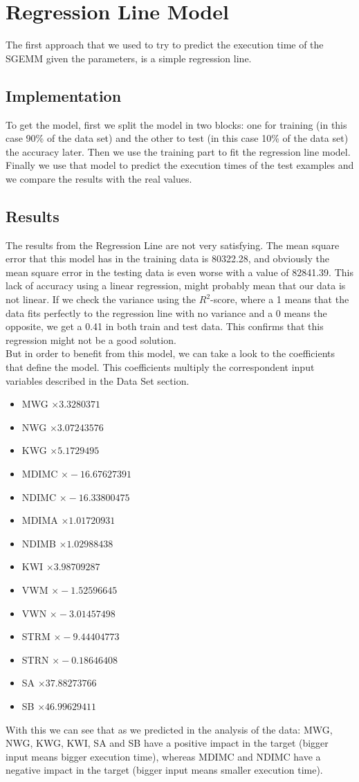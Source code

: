 \documentclass[sigconf,authorversion]{acmart}
\begin{document}
\section{Regression Line Model}
The first approach that we used to try to predict the execution time of the SGEMM given the parameters, is a simple regression line.
\subsection{Implementation}
To get the model, first we split the model in two blocks: one for training (in this case 90\% of the data set) and the other to test (in this case 10\% of the data set) the accuracy later. Then we use the training part to fit the regression line model. Finally we use that model to predict the execution times of the test examples and we compare the results with the real values.
\subsection{Results}
The results from the Regression Line are not very satisfying. The mean square error that this model has in the training data is 80322.28, and obviously the mean square error in the testing data is even worse with a value of 82841.39. This lack of accuracy using a linear regression, might probably mean that our data is not linear. If we check the variance using the $R^2$-score, where a 1 means that the data fits perfectly to the regression line with no variance and a 0 means the opposite, we get a 0.41 in both train and test data. This confirms that this regression might not be a good solution.\\
But in order to benefit from this model, we can take a look to the coefficients that define the model. This coefficients multiply the correspondent input variables described in the Data Set section.
\begin{itemize}
  \item MWG $\times 3.3280371$
  \item NWG $\times 3.07243576$
  \item KWG $\times 5.1729495$
  \item MDIMC $\times -16.67627391$
  \item NDIMC $\times -16.33800475$
  \item MDIMA $\times 1.01720931$
  \item NDIMB $\times 1.02988438$
  \item KWI $\times 3.98709287$
  \item VWM $\times -1.52596645$
  \item VWN $\times -3.01457498$
  \item STRM $\times -9.44404773$
  \item STRN $\times -0.18646408$
  \item SA $\times 37.88273766$
  \item SB $\times 46.99629411$
\end{itemize}
With this we can see that as we predicted in the analysis of the data: MWG, NWG, KWG, KWI, SA and SB have a positive impact in the target (bigger input means bigger execution time), whereas MDIMC and NDIMC have a negative impact in the target (bigger input means smaller execution time).
\end{document}
